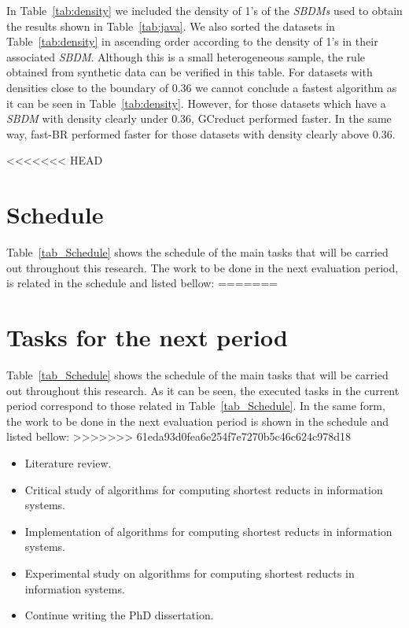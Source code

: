 \documentclass[authoryear,11pt]{elsarticle}
\begin{document}
  In Table~\ref{tab:density} we included the density of 1's of the \textit{SBDMs} used to obtain the results shown in Table~\ref{tab:java}. We also sorted the datasets in Table~\ref{tab:density} in ascending order according to the density of 1's in their associated \textit{SBDM}. Although this is a small heterogeneous sample, the rule obtained from synthetic data can be verified in this table. For datasets with densities close to the boundary of 0.36 we cannot conclude a fastest algorithm as it can be seen in Table~\ref{tab:density}. However, for those datasets which have a \textit{SBDM} with density clearly under 0.36, GCreduct performed faster. In the same way, fast-BR performed faster for those datasets with density clearly above 0.36.

<<<<<<< HEAD
\section{Schedule}\label{sec_schedule}
  Table~\ref{tab_Schedule} shows the schedule of the main tasks that will be carried out throughout this research. The work to be done in the next evaluation period, is related in the schedule and listed bellow:
=======
\section{Tasks for the next period}\label{sec_schedule}
  Table~\ref{tab_Schedule} shows the schedule of the main tasks that will be carried out throughout this research. As it can be seen, the executed tasks in the current period correspond to those related in Table~\ref{tab_Schedule}. In the same form, the work to be done in the next evaluation period is shown in the schedule and listed bellow:
>>>>>>> 61eda93d0fea6e254f7e7270b5c46c624c978d18
  
  \begin{itemize}
  	\itemsep0em 
  	\item Literature review.
  	\item Critical study of algorithms for computing shortest reducts in information systems.
  	\item Implementation of algorithms for computing shortest reducts in information systems.
  	\item Experimental study on algorithms for computing shortest reducts in information systems.
  	\item Continue writing the PhD dissertation.
  \end{itemize}
  
\end{document}
